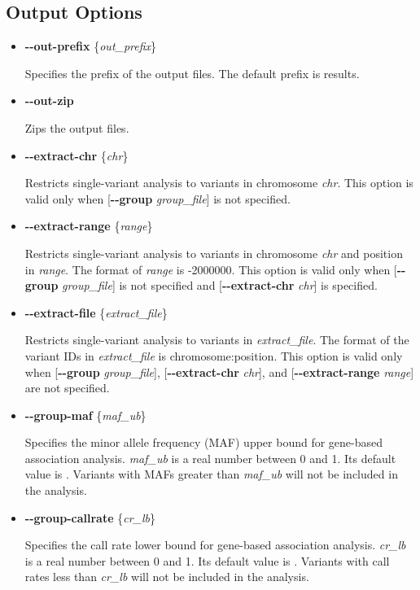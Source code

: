 \documentclass[12pt,letter]{article}
\begin{document}
\subsection{Output Options}
\begin{itemize}
\item {\bf -{}-out-prefix} \{{\it out\_prefix}\}

Specifies the prefix of the output files. The default prefix is {\ttfamily results}.

\item {\bf -{}-out-zip}

Zips the output files.

\item {\bf -{}-extract-chr} \{{\it chr}\}

Restricts single-variant analysis to variants in chromosome {\it chr}. This option is valid
only when [{\bf -{}-group} {\it group\_file}] is not specified.

\item {\bf -{}-extract-range} \{{\it range}\}

Restricts single-variant analysis to variants in chromosome {\it chr} and position in {\it range}.
The format of {\it range} is {-2000000}. 
This option is valid
only when [{\bf -{}-group} {\it group\_file}] is not specified and [{\bf -{}-extract-chr} {\it chr}] is specified.

\item {\bf -{}-extract-file} \{{\it extract\_file}\}

Restricts single-variant analysis to variants in {\it extract\_file}.
The format of the variant IDs in {\it extract\_file}
is {\ttfamily chromosome:position}.
This option is valid
only when [{\bf -{}-group} {\it group\_file}], [{\bf -{}-extract-chr} {\it chr}], and [{\bf -{}-extract-range} {\it range}]
are not specified.

\item {\bf -{}-group-maf} \{{\it maf\_ub}\}

Specifies the minor allele frequency (MAF) upper bound for gene-based association analysis.
{\it maf\_ub} is a real number between 0 and 1. Its default value is {}.
Variants with MAFs greater than {\it maf\_ub} will not be included in the analysis.

\item {\bf -{}-group-callrate} \{{\it cr\_lb}\}

Specifies the call rate lower bound for gene-based association analysis.
{\it cr\_lb} is a real number between 0 and 1. Its default value is {}.
Variants with call rates less than {\it cr\_lb} will not be included in the analysis.  

\end{itemize}
\end{document}
